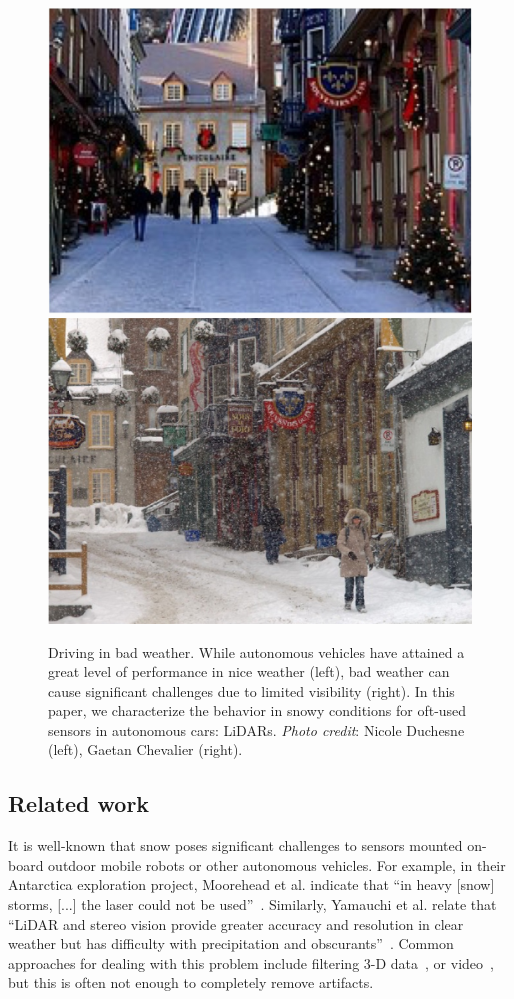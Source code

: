 \begin{figure}
\includegraphics[width=.48\linewidth]{./img/teaser/summer.jpg}
\includegraphics[width=.48\linewidth]{./img/teaser/winter.jpg}
\caption{Driving in bad weather. While autonomous vehicles have attained a great level of performance in nice weather (left), bad weather can cause significant challenges due to limited visibility (right). In this paper, we characterize the behavior in snowy conditions for oft-used sensors in autonomous cars: LiDARs. \emph{Photo credit}: Nicole Duchesne (left), Gaetan Chevalier (right).}
\label{fig:good-bad-weather}
\end{figure}

\subsection{Related work}

It is well-known that snow poses significant challenges to sensors mounted on-board outdoor mobile robots or other autonomous vehicles. For example, in their Antarctica exploration project, Moorehead et al. indicate that ``in heavy [snow] storms, [...] the laser could not be used''~\cite{Moorehead_1999_2122}. Similarly, Yamauchi et al. relate that ``LiDAR and stereo vision provide greater accuracy and resolution in clear weather but has difficulty with precipitation and obscurants''~\cite{yamauchi2010fusing}. Common approaches for dealing with this problem include filtering 3-D data~\cite{Moorehead_1999_2122}, or video~\cite{barnum2010analysis}, but this is often not enough to completely remove artifacts. 

